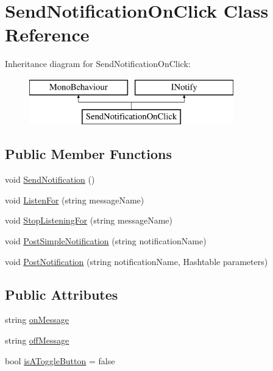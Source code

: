 \hypertarget{class_send_notification_on_click}{}\section{Send\+Notification\+On\+Click Class Reference}
\label{class_send_notification_on_click}
Inheritance diagram for Send\+Notification\+On\+Click\+:\begin{figure}[H]
\begin{center}
\leavevmode
\includegraphics[height=2.000000cm]{class_send_notification_on_click}
\end{center}
\end{figure}
\subsection*{Public Member Functions}
\begin{DoxyCompactItemize}
\item 
void \hyperlink{class_send_notification_on_click_ad6b0dc3f3e9c02874b9e1b36528ca197}{Send\+Notification} ()
\item 
void \hyperlink{class_send_notification_on_click_a7a0fdd1ca310bc3d64925ac6950b3dd7}{Listen\+For} (string message\+Name)
\item 
void \hyperlink{class_send_notification_on_click_a4000d219e31fb3bae92273db10cb0727}{Stop\+Listening\+For} (string message\+Name)
\item 
void \hyperlink{class_send_notification_on_click_ab1eda9e6357efc6e36ec6eab857f5ce4}{Post\+Simple\+Notification} (string notification\+Name)
\item 
void \hyperlink{class_send_notification_on_click_ab101bff7e8a71e157269af98e0b05d3d}{Post\+Notification} (string notification\+Name, Hashtable parameters)
\end{DoxyCompactItemize}
\subsection*{Public Attributes}
\begin{DoxyCompactItemize}
\item 
string \hyperlink{class_send_notification_on_click_aab75dbe9cf09b148b8cc477d447dfd59}{on\+Message}
\item 
string \hyperlink{class_send_notification_on_click_a26d7af8d15c31791b8470aad804c0f36}{off\+Message}
\item 
bool \hyperlink{class_send_notification_on_click_a9ba6c4c9f8ae9da8c047f39225a148aa}{is\+A\+Toggle\+Button} = false
\end{DoxyCompactItemize}



